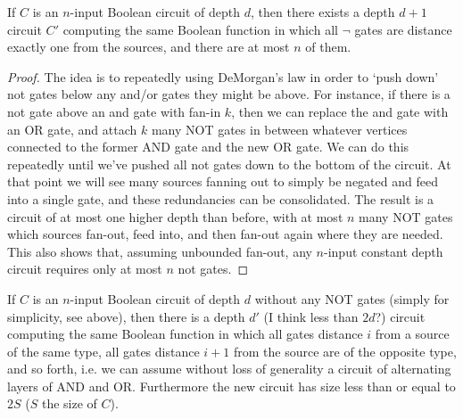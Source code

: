\begin{fact}
	If $C$ is an $n$-input Boolean circuit of depth $d$, then there exists a depth $d+1$ circuit $C'$ computing the same Boolean function in which all $\neg$ gates are distance exactly one from the sources, and there are at most $n$ of them.
\end{fact}
\begin{proof}
	The idea is to repeatedly using DeMorgan's law in order to `push down' not gates below any and/or gates they might be above. For instance, if there is a not gate above an and gate with fan-in $k$, then we can replace the and gate with an OR gate, and attach $k$ many NOT gates in between whatever vertices connected to the former AND gate and the new OR gate. We can do this repeatedly until we've pushed all not gates down to the bottom of the circuit. At that point we will see many sources fanning out to simply be negated and feed into a single gate, and these redundancies can be consolidated. The result is a circuit of at most one higher depth than before, with at most $n$ many NOT gates which sources fan-out, feed into, and then fan-out again where they are needed. This also shows that, assuming unbounded fan-out, any $n$-input constant depth circuit requires only at most $n$ not gates. 
\end{proof}
\begin{fact}
	If $C$ is an $n$-input Boolean circuit of depth $d$ without any NOT gates (simply for simplicity, see above), then there is a depth $d'$ (I think less than $2d$?) circuit computing the same Boolean function in which all gates distance $i$ from a source of the same type, all gates distance $i+1$ from the source are of the opposite type, and so forth, i.e. we can assume without loss of generality a circuit of alternating layers of AND and OR. Furthermore the new circuit has size less than or equal to $2S$ ($S$ the size of $C$).
\end{fact}
